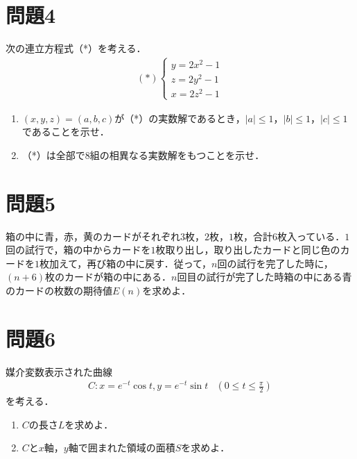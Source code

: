 \documentclass[unicode,12pt, A4j]{ltjsarticle}%
\begin{document}
\section{問題4}
次の連立方程式（*）を考える．
\begin{align*}
 (*) 
\begin{cases}
 y=2x^2-1 \\
 z=2y^2-1 \\
 x=2z^2-1 
\end{cases}
\end{align*}
\begin{enumerate}
 \item $(x,y,z)=(a,b,c)$が（*）の実数解であるとき，$|a|\le 1$，$|b|\le 1$，$|c|\le 1$であることを示せ．
 \item （*）は全部で$8$組の相異なる実数解をもつことを示せ．
\end{enumerate}

\section{問題5}
箱の中に青，赤，黄のカードがそれぞれ$3$枚，$2$枚，$1$枚，合計$6$枚入っている．$1$回の試行で，箱の中からカードを$1$枚取り出し，取り出したカードと同じ色のカードを$1$枚加えて，再び箱の中に戻す．従って，$n$回の試行を完了した時に，$(n+6)$枚のカードが箱の中にある．$n$回目の試行が完了した時箱の中にある青のカードの枚数の期待値$E(n)$を求めよ．

\section{問題6}
媒介変数表示された曲線
\begin{align*}
 C: x=e^{-t}\cos t, y=e^{-t}\sin t & \left(0\le t\le \frac{\pi}{2}\right)
\end{align*}
を考える．
\begin{enumerate}
 \item $C$の長さ$L$を求めよ．
 \item $C$と$x$軸，$y$軸で囲まれた領域の面積$S$を求めよ．
\end{enumerate}
\end{document}
